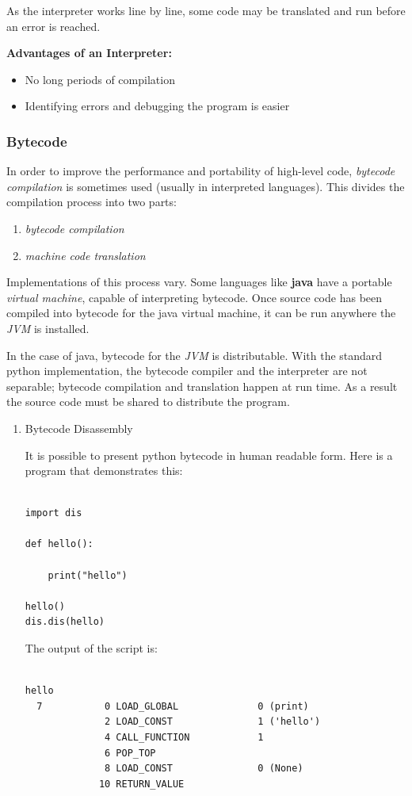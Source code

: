 \documentclass[9pt]{article}
\begin{document}
As the interpreter works line by line, some code may be translated and run before an error is reached.

\textbf{Advantages of an Interpreter:}

\begin{itemize}
\item No long periods of compilation
\item Identifying errors and debugging the program is easier
\end{itemize}

\subsubsection{Bytecode}
\label{sec:org2eec0c4}

In order to improve the performance and portability of high-level code, \emph{bytecode compilation} is sometimes used (usually in interpreted languages). This divides the compilation process into two parts:

\begin{enumerate}
\item \emph{bytecode compilation}
\item \emph{machine code translation}
\end{enumerate}

Implementations of this process vary. Some languages like \textbf{java} have a portable \emph{virtual machine}, capable of interpreting bytecode. Once source code has been compiled into bytecode for the java virtual machine, it can be run anywhere the \emph{JVM} is installed.

In the case of java, bytecode for the \emph{JVM} is distributable. With the standard python implementation, the bytecode compiler and the interpreter are not separable; bytecode compilation and translation happen at run time. As a result the source code must be shared to distribute the program.

\begin{enumerate}
\item Bytecode Disassembly
\label{sec:org642eb37}

It is possible to present python bytecode in human readable form. Here is a program that demonstrates this:

\begin{verbatim}

import dis

def hello():

    print("hello")

hello()
dis.dis(hello)

\end{verbatim}

The output of the script is:

\begin{verbatim}

hello
  7           0 LOAD_GLOBAL              0 (print)
              2 LOAD_CONST               1 ('hello')
              4 CALL_FUNCTION            1
              6 POP_TOP
              8 LOAD_CONST               0 (None)
             10 RETURN_VALUE

\end{verbatim}
\end{enumerate}
\end{document}
